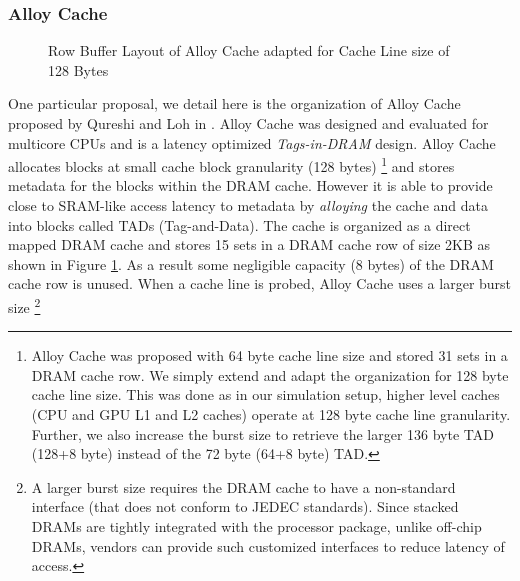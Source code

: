 \subsubsection{Alloy Cache} \label{alloy-background}
\begin{figure}[!htb]
	\centering
	\def\svgwidth{\columnwidth}
	
	\caption{Row Buffer Layout of Alloy Cache adapted for Cache Line size of 128 Bytes}
	\label{fig:dramcache-rb}
\end{figure}
\par One particular proposal, we detail here is the organization of Alloy Cache proposed by Qureshi and Loh in \cite{alloy}. Alloy Cache was designed and evaluated for multicore CPUs and is a latency optimized \textit{Tags-in-DRAM} design. Alloy Cache allocates blocks at small cache block granularity (128 bytes)
\footnote{Alloy Cache was proposed with 64 byte cache line size and stored 31 sets in a DRAM cache row. We simply extend and adapt the organization for 128 byte cache line size. This was done as in our simulation setup, higher level caches (CPU and GPU L1 and L2 caches) operate at 128 byte cache line granularity. Further, we also increase the burst size to retrieve the larger 136 byte TAD (128+8 byte) instead of the 72 byte (64+8 byte) TAD.} 
and stores metadata for the blocks within the DRAM cache. However it is able to provide close to SRAM-like access latency to metadata by \textit{alloying} the cache and data into blocks called TADs (Tag-and-Data). The cache is organized as a direct mapped DRAM cache and stores 15 sets in a DRAM cache row of size 2KB as shown in Figure \ref{fig:dramcache-rb}. As a result some negligible capacity (8 bytes) of the DRAM cache row is unused. When a cache line is probed, Alloy Cache uses a larger burst size
\footnote{A larger burst size requires the DRAM cache to have a non-standard interface (that does not conform to JEDEC standards). Since stacked DRAMs are tightly integrated with the processor package, unlike off-chip DRAMs, vendors can provide such customized interfaces to reduce latency of access.}
